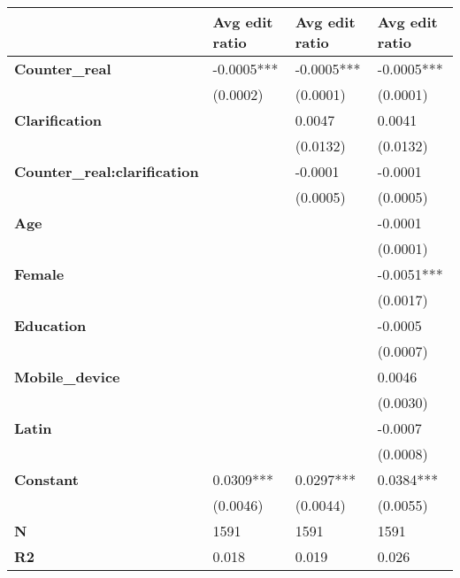 \begin{tabular}{llll}
\toprule
{} & Avg edit ratio & Avg edit ratio & Avg edit ratio \\
\midrule
\textbf{Counter\_real              } &     -0.0005*** &     -0.0005*** &     -0.0005*** \\
                           &       (0.0002) &       (0.0001) &       (0.0001) \\
\textbf{Clarification             } &                &         0.0047 &         0.0041 \\
                           &                &       (0.0132) &       (0.0132) \\
\textbf{Counter\_real:clarification} &                &        -0.0001 &        -0.0001 \\
                           &                &       (0.0005) &       (0.0005) \\
\textbf{Age                       } &                &                &        -0.0001 \\
                           &                &                &       (0.0001) \\
\textbf{Female                    } &                &                &     -0.0051*** \\
                           &                &                &       (0.0017) \\
\textbf{Education                 } &                &                &        -0.0005 \\
                           &                &                &       (0.0007) \\
\textbf{Mobile\_device             } &                &                &         0.0046 \\
                           &                &                &       (0.0030) \\
\textbf{Latin                     } &                &                &        -0.0007 \\
                           &                &                &       (0.0008) \\
\textbf{Constant                  } &      0.0309*** &      0.0297*** &      0.0384*** \\
                           &       (0.0046) &       (0.0044) &       (0.0055) \\
\textbf{N                         } &           1591 &           1591 &           1591 \\
\textbf{R2                        } &          0.018 &          0.019 &          0.026 \\
\bottomrule
\end{tabular}

